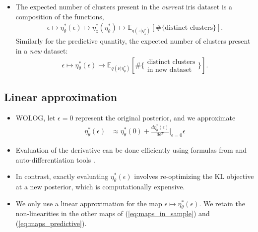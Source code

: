 \documentclass[a0,plainsections,30pt]{sciposter}\usepackage[]{graphicx}\usepackage[]{color}
\newcommand{\Expect}{\mathbb{E}}
\newcommand{\etazopt}{\eta_z^{*}}
\newcommand{\etathetaopt}{\eta_\theta^{*}}
\begin{document}
\begin{minipage}[t]{0.45\textwidth}
\begin{itemize}
\item The expected number of clusters present in the {\itshape current} iris dataset is a composition of the functions, 
\vspace{-0.1in}
\begin{align}
\epsilon \mapsto
\etathetaopt(\epsilon) \mapsto
\etazopt\left(\etathetaopt\right) \mapsto
\Expect_{q(z | \etazopt)} \left[ \#\{\text{distinct clusters}\} \right].
\label{eq:maps_in_sample}
\end{align}
\vspace{-0.1in}
Similarly for the predictive quantity, the expected number of clusters present in a {\itshape new} dataset: 
\vspace{-0.1in}
\begin{align}
\epsilon \mapsto
\etathetaopt(\epsilon) \mapsto
\Expect_{q(\nu \vert \etathetaopt)} 
\left[\#\{\substack{\text{distinct clusters}\\\text{in new dataset}}\} \right].
\label{eq:maps_predictive}
\end{align}
\end{itemize}

\vspace{-0.9in}
\subsection*{Linear approximation}
\vspace{-0.2in}
\begin{itemize}
\item WOLOG, let $\epsilon=0$ represent the original posterior, and we approximate
\begin{align}
\etathetaopt(\epsilon)  &\approx  \etathetaopt(0) + 
\frac{d \etathetaopt(\epsilon)}{d\epsilon^T}\Big|_{\epsilon=0} \epsilon
\label{eq:linear_approx}
\end{align}

\item Evaluation of the derivative can be done efficiently using formulas from \cite{giordano:2017:covariances} and auto-differentiation tools \cite{maclaurin:2015:autograd}.

\item In contrast, exactly evaluating $\etathetaopt(\epsilon)$ involves re-optimizing the KL objective at a new posterior, which is computationally expensive.
% 
\item We only use a linear approximation for the map $\epsilon \mapsto \etathetaopt(\epsilon)$. {We retain the non-linearities in the other maps of (\ref{eq:maps_in_sample}) and (\ref{eq:maps_predictive}). }


\end{itemize}
\end{minipage}
\end{document}

